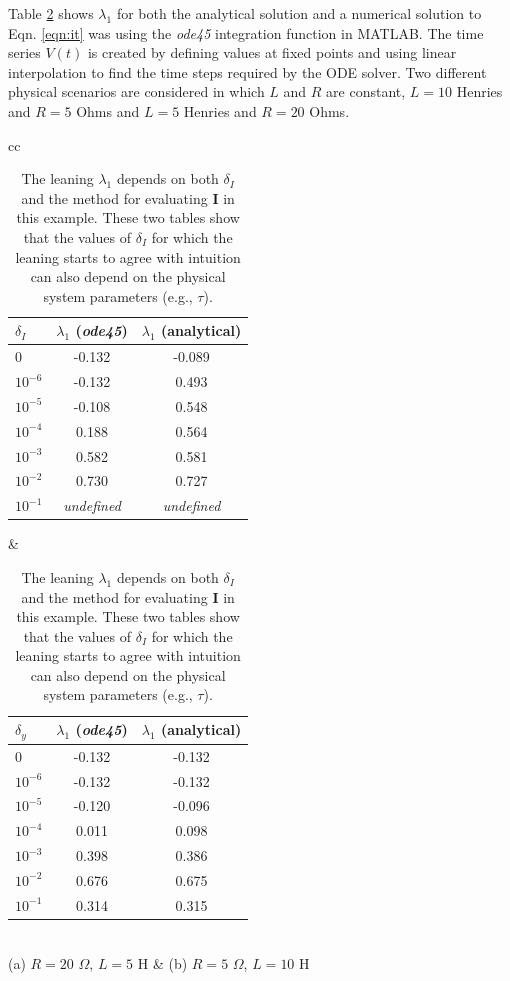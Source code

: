 \documentclass[a4paper,11pt,twocolumn]{article}
\begin{document}
Table \ref{tab:rl} shows $\lambda_1$ for both the analytical solution and a numerical solution to Eqn. \ref{eqn:it} was using the {\em ode45} integration function in MATLAB.  The time series $V(t)$ is created by defining values at fixed points and using linear interpolation to find the time steps required by the ODE solver.  Two different physical scenarios are considered in which $L$ and $R$ are constant, $L=10$ Henries and $R=5$ Ohms and $L=5$ Henries and $R=20$ Ohms.  
\begin{table}
\begin{tabular}{cc}
\begin{tabular}{lcc}
$\delta_I$ & $\lambda_1$ ({\em ode45}) & $\lambda_1$ (analytical)\\
\hline
0 & -0.132 & -0.089 \\
$10^{-6}$ & -0.132 & 0.493 \\
$10^{-5}$ & -0.108 & 0.548 \\
$10^{-4}$ & 0.188 & 0.564 \\
$10^{-3}$ & 0.582 & 0.581 \\ 
$10^{-2}$ & 0.730 & 0.727 \\
$10^{-1}$ & {\em undefined} & {\em undefined}\\
\end{tabular} &
\begin{tabular}{lcc}
$\delta_y$ & $\lambda_1$ ({\em ode45}) & $\lambda_1$ (analytical)\\
\hline
0 & -0.132 & -0.132 \\
$10^{-6}$ & -0.132 & -0.132 \\
$10^{-5}$ & -0.120 & -0.096 \\
$10^{-4}$ & 0.011 & 0.098 \\
$10^{-3}$ & 0.398 & 0.386 \\
$10^{-2}$ & 0.676 & 0.675 \\
$10^{-1}$ & 0.314 & 0.315 \\
\end{tabular} \\
(a) $R = 20$ $\Omega$, $L = 5$ H & (b) $R = 5$ $\Omega$, $L = 10$ H\\
\end{tabular}
\caption{The leaning $\lambda_1$ depends on both $\delta_I$ and the method for evaluating $\mathbf{I}$ in this example.  These two tables show that the values of $\delta_I$ for which the leaning starts to agree with intuition can also depend on the physical system parameters (e.g., $\tau$).}
\label{tab:rl}
\end{table}
\end{document}

